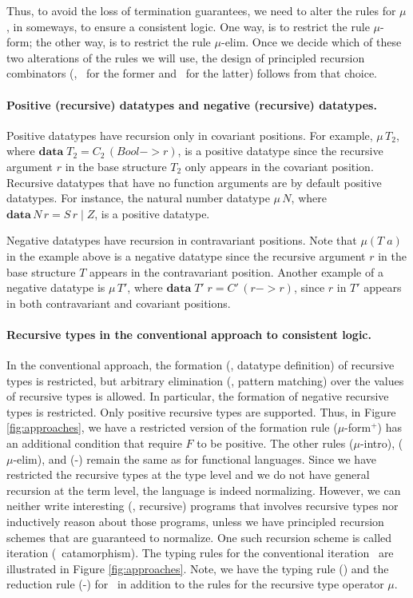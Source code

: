 Thus, to avoid the loss of termination guarantees, we need to alter the rules
for $\mu$, in someways, to ensure a consistent logic. One way, is to restrict
the rule {\small $\mu$-form}; the other way, is to restrict the rule
{\small $\mu$-elim}. Once we decide which of these two alterations of the
rules we will use, the design of principled recursion combinators (\eg, \It\
for the former and \MIt\ for the latter) follows from that choice.

\paragraph{Positive (recursive) datatypes and negative (recursive) datatypes.}
Positive datatypes have recursion only in covariant positions.
For example, $\mu\,T_2$, where $\textbf{data}\;T_2 = C_2\,(Bool -> r)$,
is a positive datatype since the recursive argument $r$ in
the base structure $T_2$ only appears in the covariant position.
Recursive datatypes that have no function arguments are by default
positive datatypes. For instance, the natural number datatype $\mu\,N$,
where $\textbf{data}\,N\,r=S\,r \mid Z$, is a positive datatype.


Negative datatypes have recursion in contravariant positions.
Note that $\mu(T\;a)$ in the example above is a negative datatype
since the recursive argument $r$ in the base structure $T$ appears
in the contravariant position. Another example of a negative datatype is
$\mu\,T'$, where $\textbf{data}\;T'\;r = C'\,(r -> r)$, since $r$ in $T'$
appears in both contravariant and covariant positions.

\paragraph{Recursive types in the conventional approach to consistent logic.}
In the conventional approach, the formation (\ie, datatype definition) of
recursive types is restricted, but arbitrary elimination (\ie, pattern matching)
over the values of recursive types is allowed. In particular, the formation of
negative recursive types is restricted. Only positive recursive types are
supported. Thus, in Figure \ref{fig:approaches}, we have a restricted version of
the formation rule {\small($\mu$-form$^{+}$)} has an additional condition that
require $F$ to be positive. The other rules {\small($\mu$-intro)},
{\small($\mu$-elim)}, and {\small(\unIn-\In)} remain the same as for
functional languages. Since we have restricted the recursive types
at the type level and we do not have general recursion at the term level,
the language is indeed normalizing. However, we can neither write
interesting (\ie, recursive) programs that involves recursive types nor
inductively reason about those programs, unless we have principled recursion
schemes that are guaranteed to normalize. One such recursion scheme is called
iteration (\aka\ catamorphism). The typing rules for the conventional iteration
\It\ are illustrated in Figure \ref{fig:approaches}. Note, we have the typing
rule {\small(\It)} and the reduction rule {\small(\It-\In)} for \It\,
in addition to the rules for the recursive type operator $\mu$.

